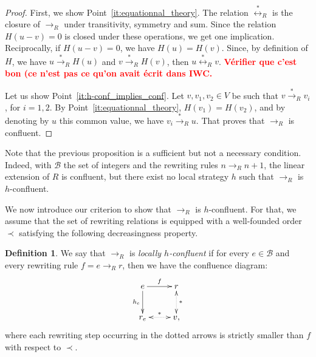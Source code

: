 \documentclass[10pt]{easychair}
\theoremstyle{definition}
\newtheorem{definition}[theorem]{Definition}
\newcommand\todo[1]{{\bf\textcolor{red}{#1.}}}
\newcommand\basis{\mathscr{B}}
\newcommand\rewR{\to_R}
\newcommand\transR{\overset{*}{\to}_R}
\newcommand\equivR{\overset{*}{\leftrightarrow}_R}
\begin{document}
\begin{proof}
  First, we show Point~\ref{it:equationnal_theory}. The relation
  $\equivR$ is the closure of $\rewR$ under transitivity, symmetry and
  sum. Since the relation $H(u - v) = 0$ is closed under these
  operations, we get one implication. Reciprocally, if $H(u-v)=0$, we
  have $H(u)=H(v)$. Since, by definition of $H$, we have
  $u\transR H(u)$ and $v\transR H(v)$, then $u\equivR v$.
  \todo{Vérifier que c'est bon (ce n'est pas ce qu'on avait écrit dans
    IWC}
  \smallskip
  
  Let us show Point~\ref{it:h-conf_implies_conf}. Let $v,v_1,v_2\in V$ be
  such that $v\transR v_i$, for $i=1,2$. By
  Point~\ref{it:equationnal_theory}, $H(v_1)=H(v_2)$, and by denoting by
  $u$ this common value, we have $v_i\transR u$. That proves that $\rewR$
  is confluent.
\end{proof}
\medskip

Note that the previous proposition is a sufficient but not a necessary
condition. Indeed, with $\basis$ the set of integers and the rewriting
rules $n\rewR n+1$, the linear extension of $R$ is confluent, but there
exist no local strategy $h$ such that $\rewR$ is $h$-confluent.
\medskip

We now introduce our criterion to show that $\rewR$ is $h$-confluent. For
that, we assume that the set of rewriting relations is equipped with a
well-founded order $\prec$ satisfying the following decreasingness
property.

\begin{definition}\label{proper:decreasingness_property}
  We say that $\rewR$ is \emph{locally $h$-confluent} if for every
  $e\in\basis$ and every rewriting rule $f=e\rewR r$, then we have the
  confluence diagram:
  \[
  \xymatrix @C = 2.5em @R = 2.5em{
    e 
    \ar [r] ^{f}
    \ar[d] _{h_e}
    &
    r
    \ar@{<.>} [d] ^{*}
    \\
    r_e
    \ar@{<.>} [r] ^{*}
    & 
    v,
  }
  \]
  where each rewriting step occurring in the dotted arrows is strictly
  smaller than $f$ with respect to  $\prec$.
\end{definition}
\smallskip
\end{document}
